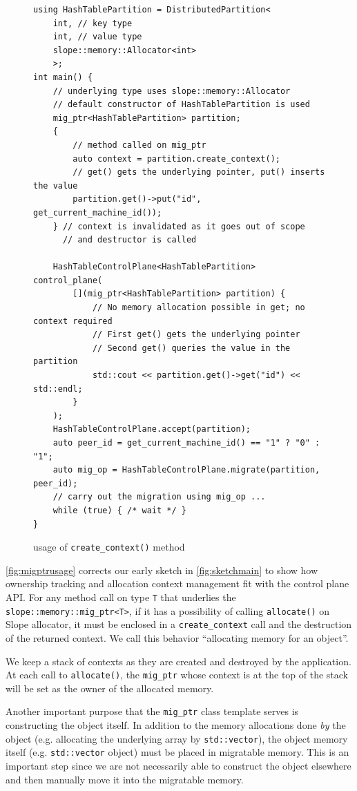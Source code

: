 \begin{figure}[tp]
\begin{lstlisting}
using HashTablePartition = DistributedPartition<
    int, // key type
    int, // value type
    slope::memory::Allocator<int>
    >;
int main() {
    // underlying type uses slope::memory::Allocator
    // default constructor of HashTablePartition is used
    mig_ptr<HashTablePartition> partition;
    {
        // method called on mig_ptr
        auto context = partition.create_context();
        // get() gets the underlying pointer, put() inserts the value
        partition.get()->put("id", get_current_machine_id());
    } // context is invalidated as it goes out of scope
      // and destructor is called

    HashTableControlPlane<HashTablePartition> control_plane(
        [](mig_ptr<HashTablePartition> partition) {
            // No memory allocation possible in get; no context required
            // First get() gets the underlying pointer
            // Second get() queries the value in the partition
            std::cout << partition.get()->get("id") << std::endl;
        }
    );
    HashTableControlPlane.accept(partition);
    auto peer_id = get_current_machine_id() == "1" ? "0" : "1";
    auto mig_op = HashTableControlPlane.migrate(partition, peer_id);
    // carry out the migration using mig_op ...
    while (true) { /* wait */ }
}
\end{lstlisting}
\caption{
    usage of \texttt{create\_context()} method
}
\label{fig:migptrusage}
\end{figure}

\autoref{fig:migptrusage} corrects our early sketch in \autoref{fig:sketchmain}
to show how
ownership tracking and allocation context management fit with the control plane
API. For any method call
on type \texttt{T} that underlies the \texttt{slope::memory::mig\_ptr<T>},
if it has a possibility of calling \texttt{allocate()} on Slope allocator, it
must be enclosed in a \texttt{create\_context} call and the destruction of the
returned context. We call this behavior ``allocating memory for
an object''.

We keep a stack of contexts as they are created and destroyed by the application.
At each call to \texttt{allocate()}, the \texttt{mig\_ptr} whose context is at
the top of the stack will be set as the owner of the allocated memory.

Another important purpose that the \texttt{mig\_ptr} class template serves is
constructing the object itself. In addition to the memory allocations done
\emph{by} the object (e.g. allocating the underlying array by \texttt{std::vector}),
the object memory itself (e.g. \texttt{std::vector} object) must be placed in
migratable memory. This is an important step since we are not necessarily able
to construct the object elsewhere and then manually move it into the migratable
memory.


